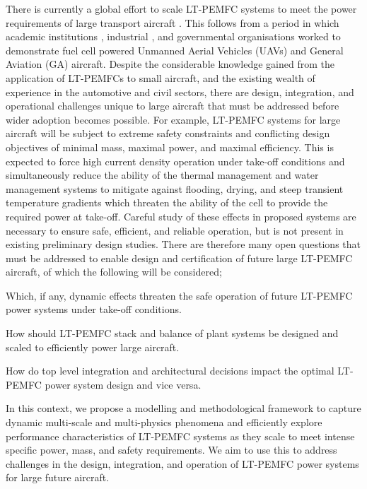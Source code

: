 There is currently a global effort to scale LT-PEMFC systems to meet the power requirements of large transport aircraft \cite{weeksZeroAviaReceivesFAA2025, retallackCommercialAircraftManufacturer2023, NEWBORNNExtGeneration, woodScalabilityHydrogenFuel}.
This follows from a period in which academic institutions \cite{kalloFuelCellSystems2013}, industrial \cite{lapena-reyFirstFuelCellManned2010}, and governmental organisations \cite{noll2004investigation} worked to demonstrate fuel cell powered Unmanned Aerial Vehicles (UAVs) and General Aviation (GA) aircraft.
Despite the considerable knowledge gained from the application of LT-PEMFCs to small aircraft, and the existing wealth of experience in the automotive and civil sectors, there are  design, integration, and operational challenges unique to large aircraft that must be addressed before wider adoption becomes possible.
For example, LT-PEMFC systems for large aircraft will be subject to extreme safety constraints and conflicting design objectives of minimal mass, maximal power, and maximal efficiency. This is expected to force high current density operation under take-off conditions and simultaneously reduce the ability of the thermal management and water management systems to mitigate against flooding, drying, and steep transient temperature gradients which threaten the ability of the cell to provide the required power at take-off.
Careful study of these effects in proposed systems are necessary to ensure safe, efficient, and reliable operation, but is not present in existing preliminary design studies.
There are therefore many open questions that must be addressed to enable design and certification of future large LT-PEMFC aircraft, of which the following will be considered; \begin{enumerate*}
	\item Which, if any, dynamic effects threaten the safe operation of future LT-PEMFC power systems under take-off conditions.
	\item How should LT-PEMFC stack and balance of plant systems be designed and scaled to efficiently power large aircraft.
	\item How do top level integration and architectural decisions impact the optimal LT-PEMFC power system design and vice versa.
\end{enumerate*}

In this context, we propose a modelling and methodological framework to capture dynamic multi-scale and multi-physics phenomena and efficiently explore performance characteristics of LT-PEMFC systems as they scale to meet intense specific power, mass, and safety requirements.
We aim to use this to address challenges in the design, integration, and operation of LT-PEMFC power systems for large future aircraft.

